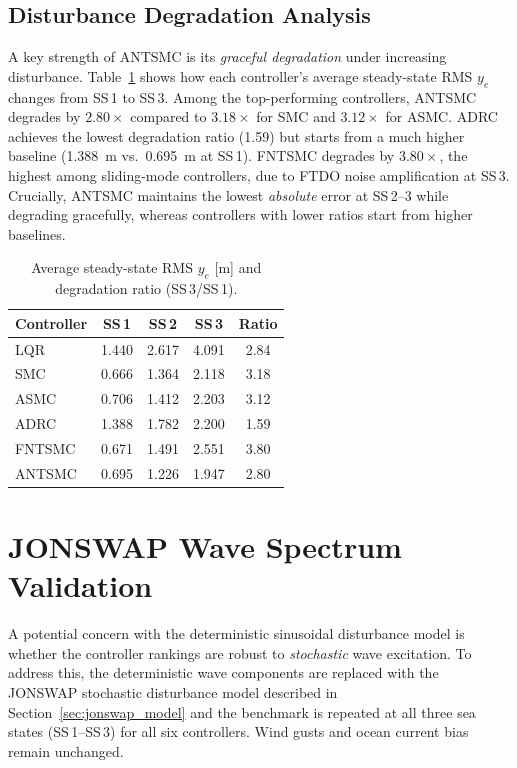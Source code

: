 \documentclass[review]{cas-dc}
\begin{document}
\subsection{Disturbance Degradation Analysis}

A key strength of ANTSMC is its \emph{graceful degradation} under increasing disturbance. Table~\ref{tab:degradation} shows how each controller's average steady-state RMS $y_e$ changes from SS\,1 to SS\,3. Among the top-performing controllers, ANTSMC degrades by $2.80\times$ compared to $3.18\times$ for SMC and $3.12\times$ for ASMC. ADRC achieves the lowest degradation ratio (1.59) but starts from a much higher baseline (1.388~m vs.\ 0.695~m at SS\,1). FNTSMC degrades by $3.80\times$, the highest among sliding-mode controllers, due to FTDO noise amplification at SS\,3. Crucially, ANTSMC maintains the lowest \emph{absolute} error at SS\,2--3 while degrading gracefully, whereas controllers with lower ratios start from higher baselines.

\begin{table}[t]
\centering
\caption{Average steady-state RMS $y_e$ [m] and degradation ratio (SS\,3/SS\,1).}
\label{tab:degradation}
\begin{tabular}{lcccc}
\toprule
Controller & SS\,1 & SS\,2 & SS\,3 & Ratio \\
\midrule
LQR & 1.440 & 2.617 & 4.091 & 2.84 \\
SMC & 0.666 & 1.364 & 2.118 & 3.18 \\
ASMC & 0.706 & 1.412 & 2.203 & 3.12 \\
ADRC & 1.388 & 1.782 & 2.200 & 1.59 \\
FNTSMC & 0.671 & 1.491 & 2.551 & 3.80 \\
ANTSMC & 0.695 & 1.226 & 1.947 & 2.80 \\
\bottomrule
\end{tabular}
\end{table}


\section{JONSWAP Wave Spectrum Validation}
\label{sec:jonswap}

A potential concern with the deterministic sinusoidal disturbance model is whether the controller rankings are robust to \emph{stochastic} wave excitation. To address this, the deterministic wave components are replaced with the JONSWAP stochastic disturbance model described in Section~\ref{sec:jonswap_model} and the benchmark is repeated at all three sea states (SS\,1--SS\,3) for all six controllers. Wind gusts and ocean current bias remain unchanged.
\end{document}
